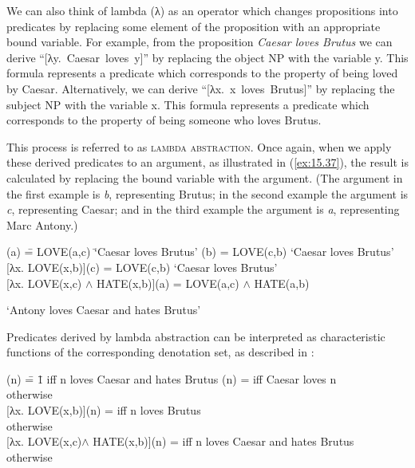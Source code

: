 We can also think of lambda (λ) as an operator which changes propositions into predicates by replacing some element of the proposition with an appropriate bound variable. For example, from the proposition \textit{Caesar loves Brutus} we can derive “[λy.~Caesar~loves~y]” by replacing the object NP with the variable y. This formula represents a predicate which corresponds to the property of being loved by Caesar. Alternatively, we can derive “[λx.~x~loves~Brutus]” by replacing the subject NP with the variable x. This formula represents a predicate which corresponds to the property of being someone who loves Brutus.



This process is referred to as \textsc{lambda abstraction}. Once again, when we apply these derived predicates to an argument, as illustrated in (\ref{ex:15.37}), the result is calculated by replacing the bound variable with the argument. (The argument in the first example is \textit{b}, representing Brutus; in the second example the argument is \textit{c}, representing Caesar; and in the third example the argument is \textit{a}, representing Marc Antony.)


\ea \label{ex:15.37}
\begin{tabbing}(a)  \= = LOVE(a,c)  \=  ‘Caesar loves Brutus’ \kill
[λy. LOVE(c,y)](b) \> = LOVE(c,b) \> ‘Caesar loves Brutus’ \\
{[λx. LOVE(x,b)]}(c)  \> = LOVE(c,b) \> ‘Caesar loves Brutus’ \\
{[λx. LOVE(x,c) $\wedge$ HATE(x,b)]}(a) \> = LOVE(a,c) $\wedge$ HATE(a,b) 
\end{tabbing}
\hfill ‘Antony loves Caesar and hates Brutus’
\z


Predicates derived by lambda abstraction can be interpreted as characteristic functions of the corresponding denotation set, as described in :


\ea \label{ex:15.38} 
\begin{tabbing}(n)  \= = \=  1 iff n loves Caesar and hates Brutus \kill 
[λy. LOVE(c,y)](n)  \> =  iff Caesar loves n \\
                    \>    otherwise \\
{[λx. LOVE(x,b)]}(n)  \> =  iff n loves Brutus \\
                    \>    otherwise \\
{[λx. LOVE(x,c)$\wedge$ HATE(x,b)]}(n)  \> =  iff n loves Caesar and hates Brutus \\
                    \>    otherwise \\
\end{tabbing}
\z 

